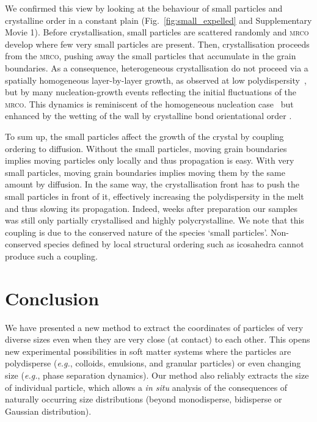 \documentclass[8.5pt,twoside,twocolumn]{article}
\begin{document}
We confirmed this view by looking at the behaviour of small particles and crystalline order in a constant plain (Fig.~\ref{fig:small_expelled} and Supplementary Movie 1). Before crystallisation, small particles are scattered randomly and \textsc{mrco} develop where few very small particles are present. Then, crystallisation proceeds from the \textsc{mrco}, pushing away the small particles that accumulate in the grain boundaries. As a consequence, heterogeneous crystallisation do not proceed via a spatially homogeneous layer-by-layer growth, as observed at low polydispersity~\cite{Sandomirski2011}, but by many nucleation-growth events reflecting the initial fluctuations of the \textsc{mrco}. This dynamics is reminiscent of the homogeneous nucleation case~\cite{Kawasaki2010c,Russo2012,Russo2012b} but enhanced by the wetting of the wall by crystalline bond orientational order \cite{watanabe2011}.

To sum up, the small particles affect the growth of the crystal by coupling ordering to diffusion. Without the small particles, moving grain boundaries implies moving particles only locally and thus propagation is easy. With very small particles, moving grain boundaries implies moving them by the same amount by diffusion. In the same way, the crystallisation front has to push the small particles in front of it, effectively increasing the polydispersity in the melt and thus slowing its propagation. Indeed, weeks after preparation our samples was still only partially crystallised and highly polycrystalline. We note that this coupling is due to the conserved nature of the species `small particles'. Non-conserved species defined by local structural ordering such as icosahedra cannot produce such a coupling.

\section{Conclusion}
\label{sec:conclusion}

We have presented a new method to extract the coordinates of particles of very diverse sizes even when they are very close (at contact) to each other. This opens new experimental possibilities in soft matter systems where the particles are polydisperse (\emph{e.g.}, colloids, emulsions, and granular particles) or even changing size (\emph{e.g.}, phase separation dynamics). Our method also reliably extracts the size of individual particle, which allows a \emph{in situ} analysis of the consequences of naturally occurring size distributions (beyond monodisperse, bidisperse or Gaussian distribution).
\end{document}
